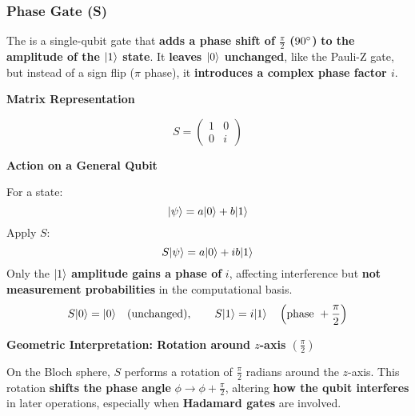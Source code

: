 \subsubsection{Phase Gate (S)}\label{subsubsection: Phase Gate S}

The  is a single-qubit gate that \textbf{adds a phase shift of $\frac{\pi}{2}$ ($90\degree$)} \textbf{to the amplitude of the $| 1 \rangle$ state}. It \textbf{leaves $| 0 \rangle$ unchanged}, like the Pauli-Z gate, but instead of a sign flip ($\pi$ phase), it \textbf{introduces a complex phase factor $i$}.

\highspace
\begin{flushleft}
    \textcolor{Green3}{ \textbf{Matrix Representation}}
\end{flushleft}
\begin{equation}
    S = \begin{pmatrix}
        1 & 0 \\ 0 & i
    \end{pmatrix}
\end{equation}

\highspace
\begin{flushleft}
    \textcolor{Green3}{ \textbf{Action on a General Qubit}}
\end{flushleft}
For a state:
\begin{equation*}
    | \psi \rangle = a| 0 \rangle + b| 1 \rangle
\end{equation*}
Apply $S$:
\begin{equation*}
    S| \psi \rangle = a| 0 \rangle + ib| 1 \rangle
\end{equation*}
Only the $| 1 \rangle$ \textbf{amplitude gains a phase of} $i$, affecting interference but \textbf{not measurement probabilities} in the computational basis.
\begin{equation*}
    S| 0 \rangle = | 0 \rangle \hspace{1em} \text{(unchanged)}, \hspace{2em} S| 1 \rangle = i| 1 \rangle \hspace{1em} \left(\text{phase } + \frac{\pi}{2}\right)
\end{equation*}

\highspace
\begin{flushleft}
    \textcolor{Green3}{ \textbf{Geometric Interpretation: Rotation around $z$-axis $\left(\frac{\pi}{2}\right)$}}
\end{flushleft}
On the Bloch sphere, $S$ performs a rotation of $\frac{\pi}{2}$ radians around the $z$-axis. This rotation \textbf{shifts the phase angle} $\phi \rightarrow \phi + \frac{\pi}{2}$, altering \textbf{how the qubit interferes} in later operations, especially when \textbf{Hadamard gates} are involved.

